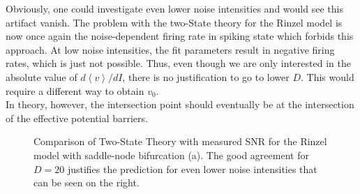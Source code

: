 \documentclass[12pt,a4paper]{article}
\begin{document}
Obviously, one could investigate even lower noise intensities and would see this artifact vanish. The problem with the two-State theory for the Rinzel model is now once again the noise-dependent firing rate in spiking state which forbids this approach. At low noise intensities, the fit parameters result in negative firing rates, which is just not possible. Thus, even though we are only interested in the absolute value of $d\left<v\right>/dI$, there is no justification to go to lower $D$. This would require a different way to obtain $v_0$. \\
In theory, however, the intersection point should eventually be at the intersection of the effective potential barriers.
\begin{figure}[H]
	\label{rinzeltst}
	\hspace*{-0.5cm}
	\caption{Comparison of Two-State Theory with measured SNR for the Rinzel model with saddle-node bifurcation (a). The good agreement for $D=20$ justifies the prediction for even lower noise intensities that can be seen on the right.}
\end{figure} 
\end{document}
